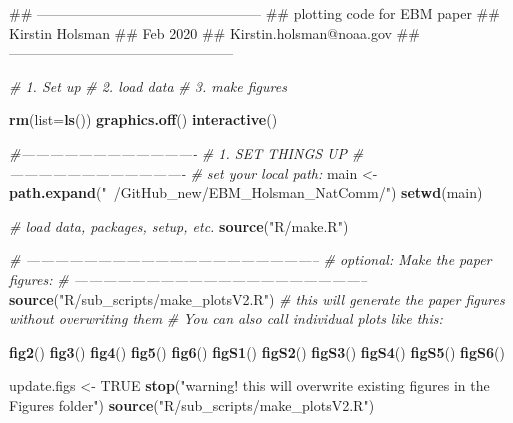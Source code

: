 \documentclass[]{article}
\newenvironment{Shaded}{\begin{snugshade}}{\end{snugshade}}
\newcommand{\KeywordTok}[1]{\textcolor[rgb]{0.13,0.29,0.53}{\textbf{{#1}}}}
\newcommand{\DataTypeTok}[1]{\textcolor[rgb]{0.13,0.29,0.53}{{#1}}}
\newcommand{\StringTok}[1]{\textcolor[rgb]{0.31,0.60,0.02}{{#1}}}
\newcommand{\CommentTok}[1]{\textcolor[rgb]{0.56,0.35,0.01}{\textit{{#1}}}}
\newcommand{\OtherTok}[1]{\textcolor[rgb]{0.56,0.35,0.01}{{#1}}}
\newcommand{\NormalTok}[1]{{#1}}
\begin{document}
\begin{Shaded}
\begin{Highlighting}[]
\NormalTok{## ------------------------------------------------}
\NormalTok{## plotting code for EBM paper }
\NormalTok{## Kirstin Holsman }
\NormalTok{## Feb 2020}
\NormalTok{## Kirstin.holsman@noaa.gov}
\NormalTok{## ------------------------------------------------}


\CommentTok{# 1. Set up}
\CommentTok{# 2. load data}
\CommentTok{# 3. make figures}

    \KeywordTok{rm}\NormalTok{(}\DataTypeTok{list=}\KeywordTok{ls}\NormalTok{())}
    \KeywordTok{graphics.off}\NormalTok{()}
    \KeywordTok{interactive}\NormalTok{()}
      
    \CommentTok{#-------------------------------------}
    \CommentTok{#   1. SET THINGS UP}
    \CommentTok{#------------------------------------- }
    \CommentTok{# set your local path:}
    \NormalTok{main  <-}\StringTok{  }\KeywordTok{path.expand}\NormalTok{(}\StringTok{"~/GitHub_new/EBM_Holsman_NatComm/"}\NormalTok{)}
    \KeywordTok{setwd}\NormalTok{(main)}
    
    \CommentTok{# load data, packages, setup, etc.}
    \KeywordTok{source}\NormalTok{(}\StringTok{"R/make.R"}\NormalTok{)}
    
    \CommentTok{# --------------------------------------------------------------}
    \CommentTok{# optional: Make the paper figures:}
    \CommentTok{# --------------------------------------------------------------}
    \KeywordTok{source}\NormalTok{(}\StringTok{"R/sub_scripts/make_plotsV2.R"}\NormalTok{)  }\CommentTok{# this will generate the paper figures without overwriting them}
    \CommentTok{# You can also call individual plots like this:}
    
    \KeywordTok{fig2}\NormalTok{()}
    \KeywordTok{fig3}\NormalTok{()}
    \KeywordTok{fig4}\NormalTok{()}
    \KeywordTok{fig5}\NormalTok{()}
    \KeywordTok{fig6}\NormalTok{()}
    \KeywordTok{figS1}\NormalTok{()}
    \KeywordTok{figS2}\NormalTok{()}
    \KeywordTok{figS3}\NormalTok{()}
    \KeywordTok{figS4}\NormalTok{()}
    \KeywordTok{figS5}\NormalTok{()}
    \KeywordTok{figS6}\NormalTok{()}
    
    \NormalTok{update.figs  <-}\StringTok{ }\OtherTok{TRUE}  
    \KeywordTok{stop}\NormalTok{(}\StringTok{"warning! this will overwrite existing figures in the Figures folder"}\NormalTok{)}
    \KeywordTok{source}\NormalTok{(}\StringTok{"R/sub_scripts/make_plotsV2.R"}\NormalTok{)}
    

\end{Highlighting}
\end{Shaded}
\end{document}
